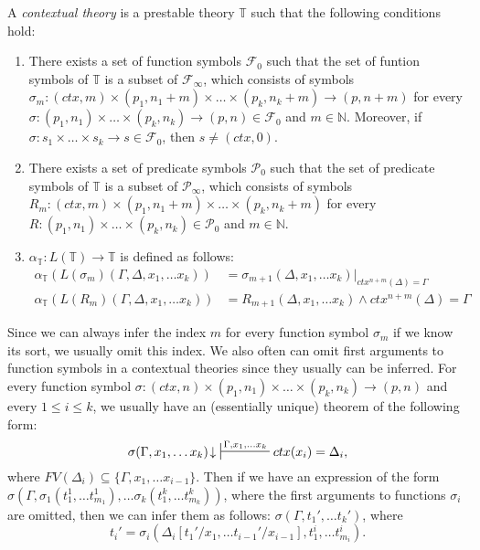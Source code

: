 \documentclass[reqno]{amsart}
\theoremstyle{definition}
\theoremstyle{remark}
\numberwithin{figure}{section}
\begin{document}
\begin{defn}
A \emph{contextual theory} is a prestable theory $\mathbb{T}$ such that the following conditions hold:
\begin{enumerate}
\item There exists a set of function symbols $\mathcal{F}_0$ such that the set of funtion symbols of $\mathbb{T}$ is a subset of
$\mathcal{F}_\infty$, which consists of symbols $\sigma_m : (ctx,m) \times (p_1,n_1+m) \times \ldots \times (p_k,n_k+m) \to (p,n+m)$
for every $\sigma : (p_1,n_1) \times \ldots \times (p_k,n_k) \to (p,n) \in \mathcal{F}_0$ and $m \in \mathbb{N}$.
Moreover, if $\sigma : s_1 \times \ldots \times s_k \to s \in \mathcal{F}_0$, then $s \neq (ctx,0)$.
\item There exists a set of predicate symbols $\mathcal{P}_0$ such that the set of predicate symbols of $\mathbb{T}$ is a subset of
$\mathcal{P}_\infty$, which consists of symbols $R_m : (ctx,m) \times (p_1,n_1+m) \times \ldots \times (p_k,n_k+m)$
for every $R : (p_1,n_1) \times \ldots \times (p_k,n_k) \in \mathcal{P}_0$ and $m \in \mathbb{N}$.
\item $\alpha_\mathbb{T} : L(\mathbb{T}) \to \mathbb{T}$ is defined as follows:
\begin{align*}
\alpha_\mathbb{T}(L(\sigma_m)(\Gamma, \Delta, x_1, \ldots x_k)) & = \sigma_{m+1}(\Delta, x_1, \ldots x_k)|_{ctx^{n+m}(\Delta) = \Gamma} \\
\alpha_\mathbb{T}(L(R_m)(\Gamma, \Delta, x_1, \ldots x_k)) & = R_{m+1}(\Delta, x_1, \ldots x_k) \land ctx^{n+m}(\Delta) = \Gamma
\end{align*}
\end{enumerate}
\end{defn}

Since we can always infer the index $m$ for every function symbol $\sigma_m$ if we know its sort, we usually omit this index.
We also often can omit first arguments to function symbols in a contextual theories since they usually can be inferred.
For every function symbol $\sigma : (ctx,n) \times (p_1,n_1) \times \ldots \times (p_k,n_k) \to (p,n)$ and every $1 \leq i \leq k$,
we usually have an (essentially unique) theorem of the following form:
\[ \sigma(\Gamma, x_1, \ldots x_k)\!\downarrow\ \sststile{}{\Gamma, x_1, \ldots x_k} ctx(x_i) = \Delta_i, \]
where $FV(\Delta_i) \subseteq \{ \Gamma, x_1, \ldots x_{i-1} \}$.
Then if we have an expression of the form $\sigma(\Gamma, \sigma_1(t^1_1, \ldots t^1_{m_1}), \ldots \sigma_k(t^k_1, \ldots t^k_{m_k}))$,
where the first arguments to functions $\sigma_i$ are omitted, then we can infer them as follows: $\sigma(\Gamma, t_1', \ldots t_k')$, where
\[ t_i' = \sigma_i(\Delta_i[t_1'/x_1, \ldots t_{i-1}'/x_{i-1}], t^i_1, \ldots t^i_{m_i}). \]
\end{document}
